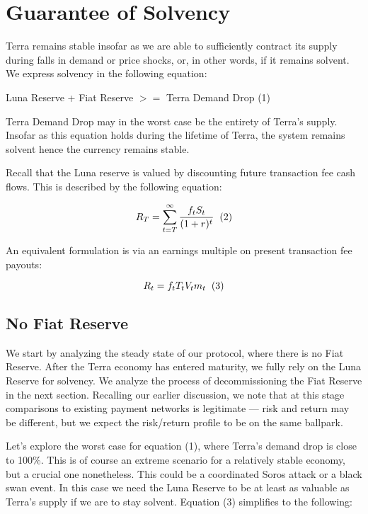 \documentclass{article}
\begin{document}
\newpage

\section{Guarantee of Solvency}

Terra remains stable insofar as we are able to sufficiently contract its supply during falls in demand or price shocks, or, in other words, if it remains solvent. We express solvency in the following equation:

\begin{center}
    Luna Reserve + Fiat Reserve ${>=}$ Terra Demand Drop (1)
\end{center}

Terra Demand Drop may in the worst case be the entirety of Terra's supply. Insofar as this equation holds during the lifetime of Terra, the system remains solvent hence the currency remains stable.

Recall that the Luna reserve is valued by discounting future transaction fee cash flows. This is described by the following equation: 

$$R_T = \sum_{t=T}^{\infty}\frac{f_tS_t}{(1+r)^t} \hspace{0.2cm} (2)$$ \newline

An equivalent formulation is via an earnings multiple on present transaction fee payouts:

 $$R_t = f_tT_tV_tm_t \hspace{0.2cm} (3)$$

\subsection{No Fiat Reserve}

We start by analyzing the steady state of our protocol, where there is no Fiat Reserve. After the Terra economy has entered maturity, we fully rely on the Luna Reserve for solvency. We analyze the process of decommissioning the Fiat Reserve in the next section. Recalling our earlier discussion, we note that at this stage comparisons to existing payment networks is legitimate — risk and return may be different, but we expect the risk/return profile to be on the same ballpark.

Let's explore the worst case for equation (1), where Terra's demand drop is close to 100\%. This is of course an extreme scenario for a relatively stable economy, but a crucial one nonetheless. This could be a coordinated Soros attack or a black swan event. In this case we need the Luna Reserve to be at least as valuable as Terra's supply if we are to stay solvent. Equation (3) simplifies to the following:
\end{document}
